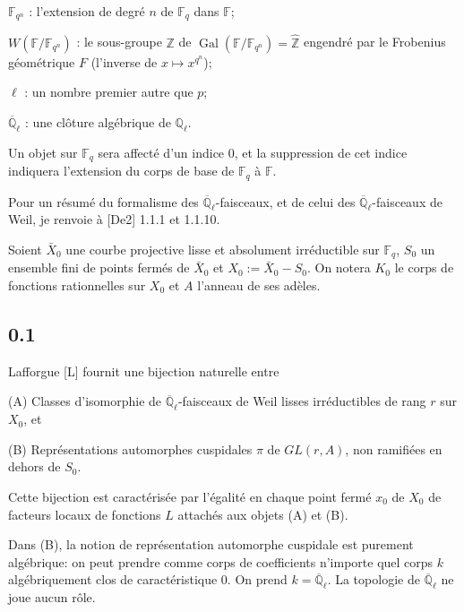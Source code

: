 \documentclass[11pt,a4paper]{article}
\theoremstyle{plain}
\theoremstyle{definition}
\DeclareMathOperator{\Gal}{Gal}
\begin{document}
$\mathbb{F}_{q^n}$ : l'extension de degr\'e $n$ de $\mathbb{F}_q$ dans $\mathbb{F}$;

$W(\mathbb{F}/\mathbb{F}_{q^n})$ : le sous-groupe $\mathbb{Z}$ de $\Gal(\mathbb{F}/\mathbb{F}_{q^n}) = \hat{\mathbb{Z}}$ engendr\'e par le Frobenius g\'eom\'etrique $F$ (l'inverse de $x \mapsto x^{q^n}$);

$\ell$ : un nombre premier autre que $p$;

$\overline{\mathbb{Q}}_\ell$ : une cl\^oture alg\'ebrique de $\mathbb{Q}_\ell$.

Un objet sur $\mathbb{F}_q$ sera affect\'e d'un indice $0$, et la suppression de cet indice indiquera l'extension du corps de base de $\mathbb{F}_q$ \`a $\mathbb{F}$.

Pour un r\'esum\'e du formalisme des $\overline{\mathbb{Q}}_\ell$-faisceaux, et de celui des $\overline{\mathbb{Q}}_\ell$-faisceaux de Weil, je renvoie \`a [De2] 1.1.1 et 1.1.10.

Soient $\bar{X}_0$ une courbe projective lisse et absolument irr\'eductible sur $\mathbb{F}_q$, $S_0$ un ensemble fini de points ferm\'es de $\bar{X}_0$ et $X_0 := \bar{X}_0 - S_0$. On notera $K_0$ le corps de fonctions rationnelles sur $X_0$ et $A$ l'anneau de ses ad\`eles.

\subsection*{0.1}

Lafforgue [L] fournit une bijection naturelle entre

(A) Classes d'isomorphie de $\overline{\mathbb{Q}}_\ell$-faisceaux de Weil lisses irr\'eductibles de rang $r$ sur $X_0$, et

(B) Repr\'esentations automorphes cuspidales $\pi$ de $GL(r,A)$, non ramifi\'ees en dehors de $S_0$.

Cette bijection est caract\'eris\'ee par l'\'egalit\'e en chaque point ferm\'e $x_0$ de $X_0$ de facteurs locaux de fonctions $L$ attach\'es aux objets (A) et (B).

Dans (B), la notion de repr\'esentation automorphe cuspidale est purement alg\'ebrique: on peut prendre comme corps de coefficients n'importe quel corps $k$ alg\'ebriquement clos de caract\'eristique $0$. On prend $k = \overline{\mathbb{Q}}_\ell$. La topologie de $\overline{\mathbb{Q}}_\ell$ ne joue aucun r\^ole.
\end{document}
